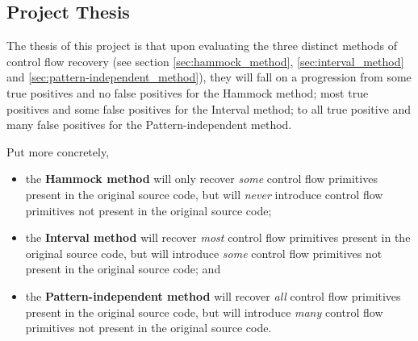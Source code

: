 
\subsection{Project Thesis}

The thesis of this project is that upon evaluating the three distinct methods of control flow recovery (see section \ref{sec:hammock_method}, \ref{sec:interval_method} and \ref{sec:pattern-independent_method}), they will fall on a progression from some true positives and no false positives for the Hammock method; most true positives and some false positives for the Interval method; to all true positive and many false positives for the Pattern-independent method.

Put more concretely,
\begin{itemize}
	\item the \textbf{Hammock method} will only recover \textit{some} control flow primitives present in the original source code, but will \textit{never} introduce control flow primitives not present in the original source code;
	\item the \textbf{Interval method} will recover \textit{most} control flow primitives present in the original source code, but will introduce \textit{some} control flow primitives not present in the original source code; and
	\item the \textbf{Pattern-independent method} will recover \textit{all} control flow primitives present in the original source code, but will introduce \textit{many} control flow primitives not present in the original source code.
\end{itemize}
